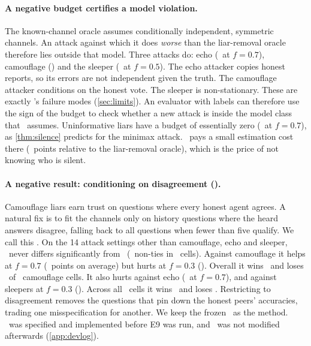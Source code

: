 \paragraph{A negative budget certifies a model violation.} The known-channel oracle assumes conditionally independent, symmetric channels. An attack against which it does \emph{worse} than the liar-removal oracle therefore lies outside that model. Three attacks do: echo (\budgetEchoSeven\ at $f=0.7$), camouflage (\budgetCamoSeven) and the sleeper (\budgetSleeperFive\ at $f=0.5$). The echo attacker copies honest reports, so its errors are not independent given the truth. The camouflage attacker conditions on the honest vote. The sleeper is non-stationary. These are exactly \race's failure modes (\cref{sec:limits}). An evaluator with labels can therefore use the sign of the budget to check whether a new attack is inside the model class that \race\ assumes. Uninformative liars have a budget of essentially zero (\budgetUninfSeven\ at $f=0.7$), as \cref{thm:silence} predicts for the minimax attack. \race\ pays a small estimation cost there (\overRemovalUninfSeven\ points relative to the liar-removal oracle), which is the price of not knowing who is silent.

\paragraph{A negative result: conditioning on disagreement (\raceD).} Camouflage liars earn trust on questions where every honest agent agrees. A natural fix is to fit the channels only on history questions where the heard answers disagree, falling back to all questions when fewer than five qualify. We call this \raceD. On the 14 attack settings other than camouflage, echo and sleeper, \raceD\ never differs significantly from \race\ (\raceDOtherNonTies\ non-ties in \raceDOtherCells\ cells). Against camouflage it helps at $f=0.7$ (\raceDCamoSeven\ points on average) but hurts at $f=0.3$ (\raceDCamoThree). Overall it wins \raceDCamoWins\ and loses \raceDCamoLosses\ of \raceDCamoCells\ camouflage cells. It also hurts against echo (\raceDEchoSeven\ at $f=0.7$), and against sleepers at $f=0.3$ (\raceDSleeperThree). Across all \raceDCells\ cells it wins \raceDWins\ and loses \raceDLosses. Restricting to disagreement removes the questions that pin down the honest peers' accuracies, trading one misspecification for another. We keep the frozen \race\ as the method. \raceD\ was specified and implemented before E9 was run, and \race\ was not modified afterwards (\cref{app:devlog}).


